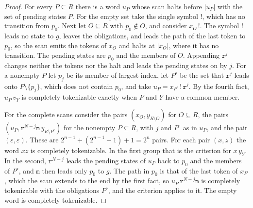 \documentclass[11pt,a4paper]{article}
\theoremstyle{definition}
\theoremstyle{plain}
\newcommand{\code}[1]{\texttt{#1}}
\begin{document}
\begin{proof}
For every $P \subseteq R$ there is a word $u_P$ whose scan halts before $|u_P|$ with the set of pending states $P$. For
the empty set take the single symbol $\code{!}$, which has no transition from $p_0$. Next let $O \subseteq R$ with
$p_0 \notin O$, and consider $x_O\,\code{!}$. The symbol $\code{!}$ leads no state to $g$, leaves the obligations, and
leads the path of the last token to $p_0$, so the scan emits the tokens of $x_O$ and halts at $|x_O|$, where it has no
transition. The pending states are $p_0$ and the members of $O$. Appending $\code{r}^j$ changes neither the tokens nor
the halt and leads the pending states on by $j$. For a nonempty $P$ let $p_j$ be its member of largest index, let
$P^\circ$ be the set that $\code{r}^j$ leads onto $P \setminus \{p_j\}$, which does not contain $p_0$, and take
$u_P = x_{P^\circ}\,\code{!}\,\code{r}^j$. By the fourth fact, $u_P\,v_Y$ is completely tokenizable exactly when $P$ and
$Y$ have a common member.

For the complete scans consider the pairs $(x_O, y_{R \setminus O})$ for $O \subseteq R$, the pairs
$(u_P, \code{r}^{N-j}\code{m}\,y_{R \setminus P^\circ})$ for the nonempty $P \subseteq R$, with $j$ and $P^\circ$ as in
$u_P$, and the pair $(\varepsilon, \varepsilon)$. These are $2^{n-1} + (2^{n-1} - 1) + 1 = 2^n$ pairs. For each pair
$(x, z)$ the word $xz$ is completely tokenizable. In the first group that is the criterion for $x\,y_Y$. In the second,
$\code{r}^{N-j}$ leads the pending states of $u_P$ back to $p_0$ and the members of $P^\circ$, and $\code{m}$ then leads
only $p_0$ to $g$. The path in $p_0$ is that of the last token of $x_{P^\circ}$, which the scan extends to the end by
the first fact, so $u_P\,\code{r}^{N-j}\code{m}$ is completely tokenizable with the obligations $P^\circ$, and the
criterion applies to it. The empty word is completely tokenizable.


\end{proof}
\end{document}
